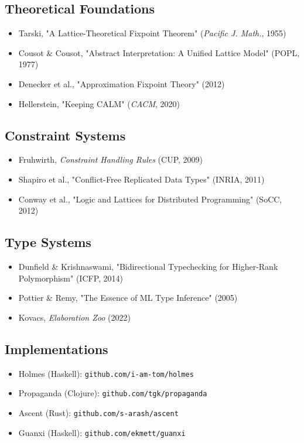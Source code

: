 \documentclass[11pt]{article}
\begin{document}
\subsection{Theoretical Foundations}
\label{sec:org03cc6b8}
\begin{itemize}
\item Tarski, "A Lattice-Theoretical Fixpoint Theorem" (\emph{Pacific J. Math.}, 1955)
\item Cousot \& Cousot, "Abstract Interpretation: A Unified Lattice Model" (POPL, 1977)
\item Denecker et al., "Approximation Fixpoint Theory" (2012)
\item Hellerstein, "Keeping CALM" (\emph{CACM}, 2020)
\end{itemize}
\subsection{Constraint Systems}
\label{sec:org9844d6a}
\begin{itemize}
\item Fruhwirth, \emph{Constraint Handling Rules} (CUP, 2009)
\item Shapiro et al., "Conflict-Free Replicated Data Types" (INRIA, 2011)
\item Conway et al., "Logic and Lattices for Distributed Programming" (SoCC, 2012)
\end{itemize}
\subsection{Type Systems}
\label{sec:org4f7f2a1}
\begin{itemize}
\item Dunfield \& Krishnaswami, "Bidirectional Typechecking for Higher-Rank Polymorphism" (ICFP, 2014)
\item Pottier \& Remy, "The Essence of ML Type Inference" (2005)
\item Kovacs, \emph{Elaboration Zoo} (2022)
\end{itemize}
\subsection{Implementations}
\label{sec:org5936c25}
\begin{itemize}
\item Holmes (Haskell): \texttt{github.com/i-am-tom/holmes}
\item Propaganda (Clojure): \texttt{github.com/tgk/propaganda}
\item Ascent (Rust): \texttt{github.com/s-arash/ascent}
\item Guanxi (Haskell): \texttt{github.com/ekmett/guanxi}
\end{itemize}
\end{document}
